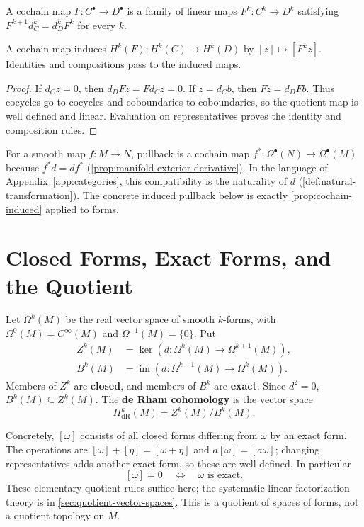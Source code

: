 \begin{definition}\label{def:cochain-map}
A cochain map $F:C^\bullet\to D^\bullet$ is a family of linear maps
$F^k:C^k\to D^k$ satisfying $F^{k+1}d_C^k=d_D^kF^k$ for every $k$.
\end{definition}
\begin{proposition}\label{prop:cochain-induced}
A cochain map induces $H^k(F):H^k(C)\to H^k(D)$ by
$[z]\mapsto[F^kz]$. Identities and compositions pass to the induced maps.
\end{proposition}
\begin{proof}
If $d_Cz=0$, then $d_DFz=Fd_Cz=0$. If $z=d_Cb$, then
$Fz=d_DFb$. Thus cocycles go to cocycles and coboundaries to
coboundaries, so the quotient map is well defined and linear.
Evaluation on representatives proves the identity and composition rules.
\end{proof}
For a smooth map $f:M\to N$, pullback is a cochain map
$f^*:\Omega^\bullet(N)\to\Omega^\bullet(M)$ because $f^*d=df^*$
(\cref{prop:manifold-exterior-derivative}). In the language of
Appendix~\ref{app:categories}, this compatibility is the naturality of
$d$ (\cref{def:natural-transformation}). The concrete induced pullback
below is exactly \cref{prop:cochain-induced} applied to forms.


\section{Closed Forms, Exact Forms, and the Quotient}
\label{sec:de-rham-definition}
\begin{definition}\label{def:de-rham-cohomology}
Let $\Omega^k(M)$ be the real vector space of smooth $k$-forms, with
$\Omega^0(M)=C^\infty(M)$ and $\Omega^{-1}(M)=\{0\}$. Put
\[
\begin{aligned}
Z^k(M)&=\ker(d:\Omega^k(M)\to\Omega^{k+1}(M)),\\
B^k(M)&=\operatorname{im}(d:\Omega^{k-1}(M)\to\Omega^k(M)).
\end{aligned}
\]
Members of $Z^k$ are \textbf{closed}, and members of $B^k$ are
\textbf{exact}. Since $d^2=0$, $B^k(M)\subseteq Z^k(M)$.
The \textbf{de Rham cohomology} is the vector space
\[
\boxed{H_{\mathrm{dR}}^k(M)=Z^k(M)/B^k(M).}
\]
\end{definition}
Concretely, $[\omega]$ consists of all closed forms differing from $\omega$
by an exact form. The operations are
$[\omega]+[\eta]=[\omega+\eta]$ and $a[\omega]=[a\omega]$; changing
representatives adds another exact form, so these are well defined.
In particular
\[
[\omega]=0\quad\Longleftrightarrow\quad\omega\text{ is exact}.
\]
These elementary quotient rules suffice here; the systematic linear
factorization theory is in \cref{sec:quotient-vector-spaces}.
This is a quotient of spaces of forms, not a quotient topology on $M$.


